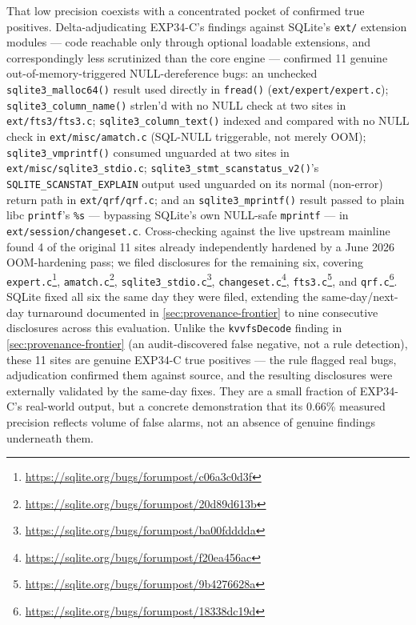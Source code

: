 That low precision coexists with a concentrated pocket of confirmed
true positives.  Delta-adjudicating EXP34-C's findings against
SQLite's \texttt{ext/} extension modules --- code reachable only
through optional loadable extensions, and correspondingly less
scrutinized than the core engine --- confirmed 11 genuine
out-of-memory-triggered NULL-dereference bugs: an unchecked
\texttt{sqlite3\_malloc64()} result used directly in \texttt{fread()}
(\texttt{ext/expert/expert.c}); \texttt{sqlite3\_column\_name()}
strlen'd with no NULL check at two sites in
\texttt{ext/fts3/fts3.c}; \texttt{sqlite3\_column\_text()} indexed and
compared with no NULL check in \texttt{ext/misc/amatch.c} (SQL-NULL
triggerable, not merely OOM); \texttt{sqlite3\_vmprintf()} consumed
unguarded at two sites in \texttt{ext/misc/sqlite3\_stdio.c};
\texttt{sqlite3\_stmt\_scanstatus\_v2()}'s
\texttt{SQLITE\_SCANSTAT\_EXPLAIN} output used unguarded on its normal
(non-error) return path in \texttt{ext/qrf/qrf.c}; and an
\texttt{sqlite3\_mprintf()} result passed to plain libc \texttt{printf}'s
\texttt{\%s} --- bypassing SQLite's own NULL-safe \texttt{mprintf} ---
in \texttt{ext/session/changeset.c}.  Cross-checking against the live
upstream mainline found 4 of the original 11 sites already
independently hardened by a June 2026 OOM-hardening pass; we filed
disclosures for the remaining six, covering
\texttt{expert.c}\footnote{\url{https://sqlite.org/bugs/forumpost/c06a3c0d3f}},
\texttt{amatch.c}\footnote{\url{https://sqlite.org/bugs/forumpost/20d89d613b}},
\texttt{sqlite3\_stdio.c}\footnote{\url{https://sqlite.org/bugs/forumpost/ba00fdddda}},
\texttt{changeset.c}\footnote{\url{https://sqlite.org/bugs/forumpost/f20ea456ac}},
\texttt{fts3.c}\footnote{\url{https://sqlite.org/bugs/forumpost/9b4276628a}},
and \texttt{qrf.c}\footnote{\url{https://sqlite.org/bugs/forumpost/18338dc19d}}.
SQLite fixed all six the same day they were filed, extending the
same-day/next-day turnaround documented in
\cref{sec:provenance-frontier} to nine consecutive disclosures across
this evaluation.  Unlike the \texttt{kvvfsDecode} finding in
\cref{sec:provenance-frontier} (an audit-discovered false negative,
not a rule detection), these 11 sites are genuine EXP34-C true
positives --- the rule flagged real bugs, adjudication confirmed them
against source, and the resulting disclosures were externally
validated by the same-day fixes.  They are a small fraction of
EXP34-C's real-world output, but a concrete demonstration that its
0.66\% measured precision reflects volume of false alarms, not an
absence of genuine findings underneath them.

